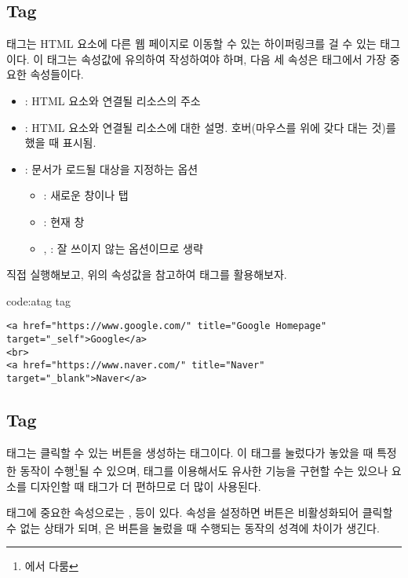 \subsection*{ Tag}
 태그는 HTML 요소에 다른 웹 페이지로 이동할 수 있는 하이퍼링크를 걸 수 있는 태그이다. 이 태그는 속성값에 유의하여 작성하여야 하며, 다음 세 속성은  태그에서 가장 중요한 속성들이다.

\begin{itemize}
    \item {}: HTML 요소와 연결될 리소스의 주소
    \item {}: HTML 요소와 연결될 리소스에 대한 설명. 호버(마우스를 위에 갖다 대는 것)를 했을 때 표시됨.
    \item {}: 문서가 로드될 대상을 지정하는 옵션
    \begin{itemize}
        \item {}: 새로운 창이나 탭
        \item {}: 현재 창
        \item {}, : 잘 쓰이지 않는 옵션이므로 생략
    \end{itemize}
\end{itemize}

\를 직접 실행해보고, 위의 속성값을 참고하여  태그를 활용해보자.

\begin{code}{code:atag}{ tag}
\begin{verbatim}
<a href="https://www.google.com/" title="Google Homepage" target="_self">Google</a>
<br>
<a href="https://www.naver.com/" title="Naver" target="_blank">Naver</a>
\end{verbatim}
\end{code}

\subsection*{ Tag}
 태그는 클릭할 수 있는 버튼을 생성하는 태그이다. 이 태그를 눌렀다가 놓았을 때 특정한 동작이 수행\footnote{에서 다룸}될 수 있으며,  태그를 이용해서도 유사한 기능을 구현할 수는 있으나 요소를 디자인할 때  태그가 더 편하므로 더 많이 사용된다.

 태그에 중요한 속성으로는 ,  등이 있다.  속성을 설정하면 버튼은 비활성화되어 클릭할 수 없는 상태가 되며, 은 버튼을 눌렀을 때 수행되는 동작의 성격에 차이가 생긴다.

